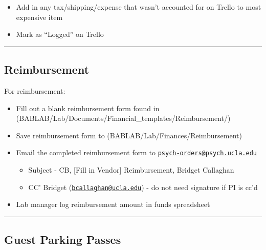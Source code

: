 \documentclass[]{book}
\providecommand{\tightlist}{%
  \setlength{\itemsep}{0pt}\setlength{\parskip}{0pt}}
\begin{document}
\begin{itemize}
  \begin{itemize}
  \tightlist
  \item
    Add in any tax/shipping/expense that wasn't accounted for on Trello to most expensive item
  \item
    Mark as ``Logged'' on Trello
  \end{itemize}
\end{itemize}

\begin{center}\rule{0.5\linewidth}{0.5pt}\end{center}

\hypertarget{reimbursement}{%
\subsection{Reimbursement}\label{reimbursement}}

For reimbursement:

\begin{itemize}
\tightlist
\item
  Fill out a blank reimbursement form found in (BABLAB/Lab/Documents/Financial\_templates/Reimbursement/)
\item
  Save reimbursement form to (BABLAB/Lab/Finances/Reimbursement)
\item
  Email the completed reimbursement form to \href{mailto:psych-orders@psych.ucla.edu}{\nolinkurl{psych-orders@psych.ucla.edu}}

  \begin{itemize}
  \tightlist
  \item
    Subject - CB, {[}Fill in Vendor{]} Reimbursement, Bridget Callaghan
  \item
    CC' Bridget (\href{mailto:bcallaghan@ucla.edu}{\nolinkurl{bcallaghan@ucla.edu}}) - do not need signature if PI is cc'd
  \end{itemize}
\item
  Lab manager log reimbursement amount in funds spreadsheet
\end{itemize}

\begin{center}\rule{0.5\linewidth}{0.5pt}\end{center}

\hypertarget{guest-parking-passes}{%
\subsection{Guest Parking Passes}\label{guest-parking-passes}}
\end{document}
